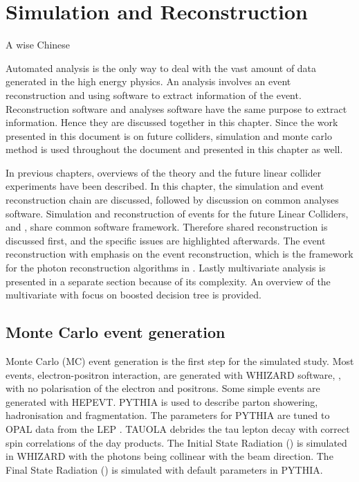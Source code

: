 \chapter{Simulation and Reconstruction}
\label{chap:Reconstruction}

%
{A wise Chinese}%


Automated analysis is the only way to deal with the vast amount of data generated in the high energy physics. An analysis involves an event reconstruction and using software to extract information of the event. Reconstruction software and analyses software have the same purpose to extract information. Hence they are discussed together in this chapter. Since the work presented in this document is on future colliders, simulation and monte carlo method is used throughout the document and presented in this chapter as well.

In previous chapters, overviews of the theory and the future linear collider experiments have been described. In this chapter, the simulation and event reconstruction chain are discussed, followed by  discussion on  common analyses software. Simulation and reconstruction of events for the future Linear Colliders, \ILC and \CLIC, share common software framework.  Therefore shared reconstruction is discussed first, and the \CLIC specific issues are highlighted afterwards. The event reconstruction with emphasis on the \pandora event reconstruction, which is the framework for the photon reconstruction algorithms in . Lastly multivariate analysis is presented in a separate section because of its complexity. An overview of the multivariate with focus on boosted decision tree is provided.


\section{Monte Carlo event generation}
\label{sec:pandoraMC}
Monte Carlo (MC) event generation is the first step for the simulated study. Most events, electron-positron interaction, are generated with WHIZARD software, \cite{whizard,Moretti:2001zz}, with no polarisation of the electron and positrons. Some simple events are generated with HEPEVT. PYTHIA \cite{Sjostrand:1995iq} is used to describe parton showering, hadronisation and fragmentation. The parameters for PYTHIA are tuned to OPAL data from the LEP \cite{Alexander:1995bk}. TAUOLA \cite{Jadach:1993hs} debrides the tau lepton decay with correct spin correlations of the day products. The Initial State Radiation (\ISR) is simulated in WHIZARD with the \ISR photons being collinear with the beam direction. The Final State Radiation (\FSR) is simulated with default parameters in PYTHIA.

